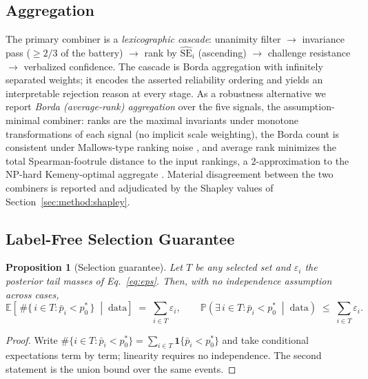 \documentclass[11pt]{article}
\newtheorem{proposition}{Proposition}
\newcommand{\pbar}{\bar{p}}
\newcommand{\E}{\mathbb{E}}
\newcommand{\Prob}{\mathbb{P}}
\newcommand{\ind}{\mathbf{1}}
\newcommand{\SE}{\mathrm{SE}}
\begin{document}
\subsection{Aggregation}
\label{sec:method:agg}

The primary combiner is a \emph{lexicographic cascade}: unanimity filter
$\to$ invariance pass ($\ge 2/3$ of the battery) $\to$ rank by
$\widehat{\SE}_i$ (ascending) $\to$ challenge resistance $\to$
verbalized confidence. The cascade is Borda aggregation with infinitely
separated weights; it encodes the asserted reliability ordering and
yields an interpretable rejection reason at every stage. As a
robustness alternative we report \emph{Borda (average-rank)
aggregation} over the five signals, the assumption-minimal combiner:
ranks are the maximal invariants under monotone transformations of each
signal (no implicit scale weighting), the Borda count is consistent
under Mallows-type ranking noise \citep{fligner1986}, and average rank
minimizes the total Spearman-footrule distance to the input rankings, a
$2$-approximation to the NP-hard Kemeny-optimal aggregate
\citep{diaconis1977}. Material disagreement between the two combiners
is reported and adjudicated by the Shapley values of
Section~\ref{sec:method:shapley}.

\subsection{Label-Free Selection Guarantee}
\label{sec:method:guarantee}

\begin{proposition}[Selection guarantee]
\label{prop:guarantee}
Let $T$ be any selected set and $\varepsilon_i$ the posterior tail
masses of Eq.~\eqref{eq:eps}. Then, with no independence assumption
across cases,
\begin{equation}
  \E\!\left[\, \#\{\, i \in T : \pbar_i < p_0^{\ast} \,\} \;\middle|\;
  \mathrm{data} \right] \;=\; \sum_{i \in T} \varepsilon_i ,
  \qquad
  \Prob\!\left(\exists\, i \in T : \pbar_i < p_0^{\ast} \;\middle|\;
  \mathrm{data}\right) \;\le\; \sum_{i \in T} \varepsilon_i .
  \label{eq:fdr}
\end{equation}
\end{proposition}

\begin{proof}
Write $\#\{i \in T : \pbar_i < p_0^{\ast}\} = \sum_{i \in T}
\ind\{\pbar_i < p_0^{\ast}\}$ and take conditional expectations term by
term; linearity requires no independence. The second statement is the
union bound over the same events.
\end{proof}
\end{document}
